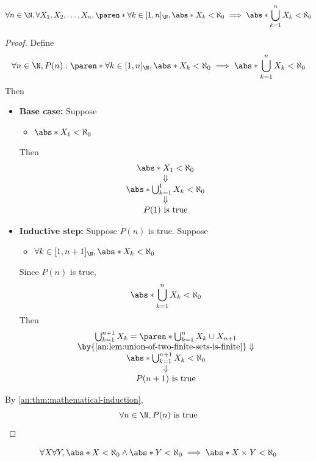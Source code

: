 \begin{theorem} \label{an:thm:finite-union-of-finite-sets-is-finite}
  \[
    \forall n \in \N, \forall X_{1}, X_{2}, \ldots, X_{n},
    \paren*{\forall k \in [1, n]_{\N}, \abs*{X_{k}} < \aleph_{0}}
    \implies \abs*{\bigcup_{k = 1}^{n} X_{k}} < \aleph_{0}
  \]
\end{theorem}

\begin{proof}
  Define
  \[
    \forall n \in \N, P(n): \paren*{\forall k \in [1, n]_{\N}, \abs*{X_{k}} < \aleph_{0}}
    \implies \abs*{\bigcup_{k = 1}^{n} X_{k}} < \aleph_{0}
  \]
  Then
  \begin{itemize}
    \item \textbf{Base case:} Suppose
          \begin{itemize}
            \item $\abs*{X_{1}} < \aleph_{0}$
          \end{itemize}
          Then
          \[
            \begin{array}{c}
              \abs*{X_{1}} < \aleph_{0}                     \\
              \Downarrow                                    \\
              \abs*{\bigcup_{k = 1}^{1} X_{k}} < \aleph_{0} \\
              \Downarrow                                    \\
              P(1) \text{ is true}
            \end{array}
          \]
    \item \textbf{Inductive step:} Suppose $P(n)$ is true. Suppose
          \begin{itemize}
            \item $\forall k \in [1, n + 1]_{\N}, \abs*{X_{k}} < \aleph_{0}$
          \end{itemize}
          Since $P(n)$ is true,
          \[
            \abs*{\bigcup_{k = 1}^{n} X_{k}} < \aleph_{0}
          \]
          Then
          \[
            \begin{array}{c}
              \bigcup_{k = 1}^{n + 1} X_{k} = \paren*{\bigcup_{k = 1}^{n} X_{k}} \cup X_{n + 1} \\
              \by{\Cref{an:lem:union-of-two-finite-sets-is-finite}} \Downarrow                  \\
              \abs*{\bigcup_{k = 1}^{n + 1} X_{k}} < \aleph_{0}                                 \\
              \Downarrow                                                                        \\
              P(n + 1) \text{ is true}
            \end{array}
          \]
  \end{itemize}
  By \cref{an:thm:mathematical-induction},
  \[
    \forall n \in \N, P(n) \text{ is true}
  \]
\end{proof}

\begin{lemma} \label{an:lem:product-of-two-finite-sets-is-finite}
  \[
    \forall X \forall Y, \abs*{X} < \aleph_{0} \land \abs*{Y} < \aleph_{0}
    \implies \abs*{X \times Y} < \aleph_{0}
  \]
\end{lemma}
